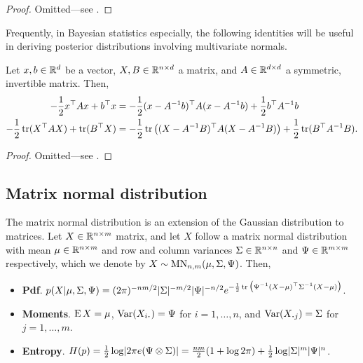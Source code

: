 \begin{proof}
  Omitted---see \citet[§8]{petersen2008matrix}.
\end{proof}

Frequently, in Bayesian statistics especially, the following identities will be useful in deriving posterior distributions involving multivariate normals.

\begin{lemma}
  Let $x,b\in\bbR^d$ be a vector, $X,B\in\bbR^{n\times d}$ a matrix, and $A \in \bbR^{d \times d}$ a symmetric, invertible matrix.
  Then,
  \begin{align*}
    -\half x^\top A x + b^\top x 
    &= -\half (x - A^{-1}b)^\top A (x - A^{-1}b) + \half b^\top A^{-1} b \\
    -\half \tr (X^\top A X) + \tr(B^\top X)
    &= -\half \tr\big((X - A^{-1}B)^\top A(X - A^{-1}B) \big) + \half\tr(B^\top A^{-1} B).
  \end{align*}
\end{lemma}

\begin{proof}
  Omitted---see \citet[§8.1.6]{petersen2008matrix}.
\end{proof}

\subsection{Matrix normal distribution}

The matrix normal distribution is an extension of the Gaussian distribution to matrices.
Let $X\in\bbR^{n \times m}$ matrix, and let $X$ follow a matrix normal distribution with mean $\mu\in\bbR^{n \times m}$ and row and column variances $\Sigma \in \bbR^{n \times n}$ and $\Psi \in \bbR^{m \times m}$ respectively, which we denote by $X\sim\MN_{n,m}(\mu,\Sigma,\Psi)$.
Then,
\begin{itemize}
  \item \textbf{Pdf}. $p(X|\mu,\Sigma,\Psi) = (2\pi)^{-nm/2}|\Sigma|^{-m/2}|\Psi|^{-n/2} e^{-\half \tr \big(\Psi^{-1}(X-\mu)^\top\Sigma^{-1}(X-\mu)\big)}$.
  \item \textbf{Moments}. $\E X=\mu$, $\Var(X_{i \bigcdot }) = \Psi$ for $i=1,\dots,n$, and $\Var(X_{\bigcdot j}) = \Sigma$ for $j=1,\dots,m$. 
  \item \textbf{Entropy}. $H(p) = \half \log \abs{2\pi e (\Psi \otimes \Sigma)} = \half[nm](1 + \log 2\pi) + \half\log\abs{\Sigma}^m\abs{\Psi}^n$.
\end{itemize}

